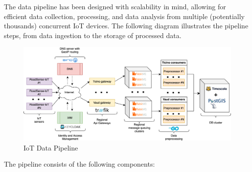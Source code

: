\documentclass[12pt,a4paper]{article}
\begin{document}
The data pipeline has been designed with scalability in mind, allowing for efficient data collection, processing, and data analysis from multiple (potentially thousands) concurrent IoT devices. The following diagram illustrates the pipeline steps, from data ingestion to the storage of processed data.

\begin{figure}[h!]
\centering
\includegraphics[width=\textwidth]{../assets/diagrams/iot_data_pipeline/iot_data_pipeline.svg}
\caption{IoT Data Pipeline}
\end{figure}

The pipeline consists of the following components:
\end{document}
